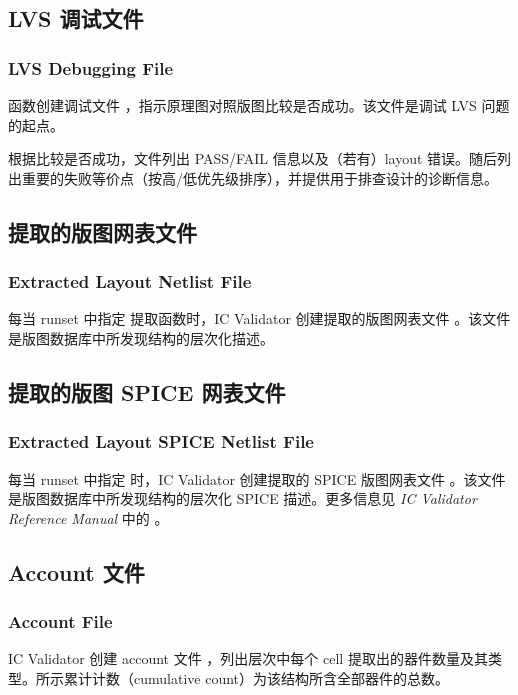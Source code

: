 \subsection{LVS 调试文件}
\subsubsection*{LVS Debugging File}

 函数创建调试文件 ，指示原理图对照版图比较是否成功。该文件是调试 LVS 问题的起点。

根据比较是否成功，文件列出 PASS/FAIL 信息以及（若有）layout 错误。随后列出重要的失败等价点（按高/低优先级排序），并提供用于排查设计的诊断信息。

\subsection{提取的版图网表文件}
\subsubsection*{Extracted Layout Netlist File}

每当 runset 中指定  提取函数时，IC Validator 创建提取的版图网表文件 。该文件是版图数据库中所发现结构的层次化描述。

\subsection{提取的版图 SPICE 网表文件}
\subsubsection*{Extracted Layout SPICE Netlist File}

每当 runset 中指定  时，IC Validator 创建提取的 SPICE 版图网表文件 。该文件是版图数据库中所发现结构的层次化 SPICE 描述。更多信息见 \textit{IC Validator Reference Manual} 中的 。

\subsection{Account 文件}
\subsubsection*{Account File}

IC Validator 创建 account 文件 ，列出层次中每个 cell 提取出的器件数量及其类型。所示累计计数（cumulative count）为该结构所含全部器件的总数。

